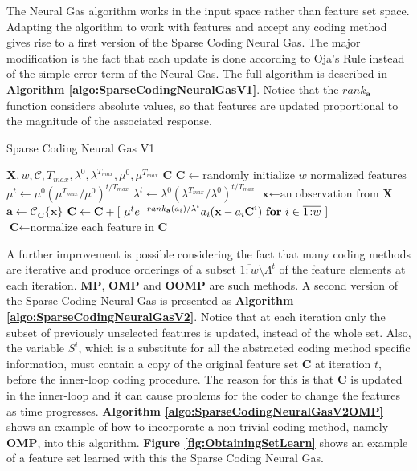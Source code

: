 \documentclass[12pt,a4paper,oneside,english]{UPBThesis}
\newcommand{\hcrange}[2]{\overline{{#1}\colon\!\!{#2}}}
\begin{document}
The Neural Gas algorithm works in the input space rather than feature set space. Adapting the algorithm to work with features and accept any coding method gives rise to a first version of the Sparse Coding Neural Gas. The major modification is the fact that each update is done according to Oja's Rule \cite{oja-rule} instead of the simple error term of the Neural Gas. The full algorithm is described in \textbf{Algorithm \ref{algo:SparseCodingNeuralGasV1}}. Notice that the $rank_{\textbf{a}}$ function considers absolute values, so that features are updated proportional to the magnitude of the associated response.

\begin{algorithm}
\caption{Sparse Coding Neural Gas V1}
\label{algo:SparseCodingNeuralGasV1}
\begin{algorithmic}
\Require $\textbf{X},w,\mathcal{C},T_{max},\lambda^0,\lambda^{T_{max}},\mu^0,\mu^{T_{max}}$
\Ensure $\textbf{C}$
\State $\textbf{C} \gets \mbox{randomly initialize $w$ normalized features}$
\For {$t = \hcrange{1}{T_{max}}$}
\State $\mu^t \gets \mu^0 (\mu^{T_{max}} / \mu^0)^{t / T_{max}}$  
\State $\lambda^t \gets \lambda^0 (\lambda^{T_{max}} / \lambda^0)^{t / T_{max}}$ 
\State $\textbf{x} \gets \text{an observation from $\textbf{X}$}$
\State $\textbf{a} \gets \mathcal{C}_{\textbf{C}}\{ \textbf{x} \}$
\State $\textbf{C} \gets \textbf{C} + [ ~ \mu^t e^{-rank_{\textbf{a}}(a_i) / \lambda^t} a_i (\textbf{x} - a_i \textbf{C}^i) ~ \mbox{\textbf{for} $i \in \hcrange{1}{w}$} ~ ]$
\State $\textbf{C} \gets \mbox{normalize each feature in $\textbf{C}$}$
\EndFor
\end{algorithmic}
\end{algorithm}

A further improvement is possible considering the fact that many coding methods are iterative and produce orderings of a subset $\hcrange{1}{w} \setminus \Lambda^t$ of the feature elements at each iteration. \textbf{MP}, \textbf{OMP} and \textbf{OOMP} are such methods. A second version of the Sparse Coding Neural Gas is presented as \textbf{Algorithm \ref{algo:SparseCodingNeuralGasV2}}. Notice that at each iteration only the subset of previously unselected features is updated, instead of the whole set. Also, the variable $S^i$, which is a substitute for all the abstracted coding method specific information, must contain a copy of the original feature set $\textbf{C}$ at iteration $t$, before the inner-loop coding procedure. The reason for this is that $\textbf{C}$ is updated in the inner-loop and it can cause problems for the coder to change the features as time progresses. \textbf{Algorithm \ref{algo:SparseCodingNeuralGasV2OMP}} shows an example of how to incorporate a non-trivial coding method, namely \textbf{OMP}, into this algorithm. \textbf{Figure \ref{fig:ObtainingSetLearn}} shows an example of a feature set learned with this the Sparse Coding Neural Gas.
\end{document}
